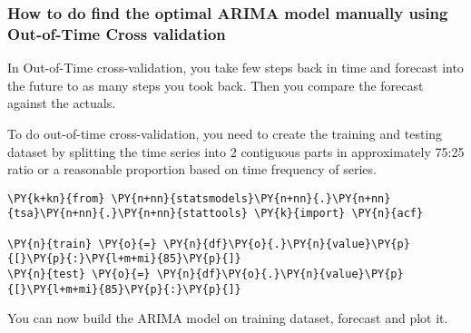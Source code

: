 %
%
    
\subsubsection{How to do find the optimal ARIMA model manually using
Out-of-Time Cross
validation}\label{how-to-do-find-the-optimal-arima-model-manually-using-out-of-time-cross-validation}

In Out-of-Time cross-validation, you take few steps back in time and
forecast into the future to as many steps you took back. Then you
compare the forecast against the actuals.

To do out-of-time cross-validation, you need to create the training and
testing dataset by splitting the time series into 2 contiguous parts in
approximately 75:25 ratio or a reasonable proportion based on time
frequency of series.

\begin{tcolorbox}[breakable, size=fbox, boxrule=1pt, pad at break*=1mm,colback=cellbackground, colframe=cellborder]
\begin{Verbatim}[commandchars=\\\{\}]
\PY{k+kn}{from} \PY{n+nn}{statsmodels}\PY{n+nn}{.}\PY{n+nn}{tsa}\PY{n+nn}{.}\PY{n+nn}{stattools} \PY{k}{import} \PY{n}{acf}

\PY{n}{train} \PY{o}{=} \PY{n}{df}\PY{o}{.}\PY{n}{value}\PY{p}{[}\PY{p}{:}\PY{l+m+mi}{85}\PY{p}{]}
\PY{n}{test} \PY{o}{=} \PY{n}{df}\PY{o}{.}\PY{n}{value}\PY{p}{[}\PY{l+m+mi}{85}\PY{p}{:}\PY{p}{]}
\end{Verbatim}
\end{tcolorbox}

You can now build the ARIMA model on training dataset, forecast and plot
it.

